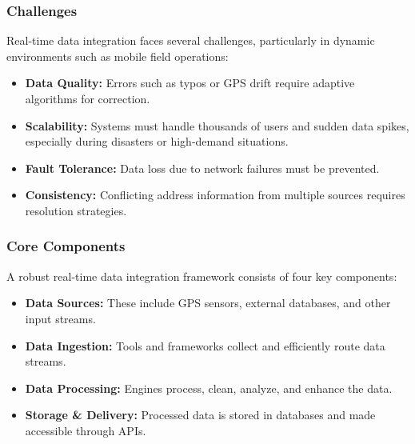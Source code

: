         \subsubsection{Challenges}
        Real-time data integration faces several challenges, particularly in dynamic environments such as mobile field operations: \autocite{vexdata2024Jun}
        
        \begin{itemize}
            \item \textbf{Data Quality:} Errors such as typos or GPS drift require adaptive algorithms for correction.
        
            \item \textbf{Scalability:} Systems must handle thousands of users and sudden data spikes, especially during disasters or high-demand situations.
        
            \item \textbf{Fault Tolerance:} Data loss due to network failures must be prevented.
        
            \item \textbf{Consistency:} Conflicting address information from multiple sources requires resolution strategies.
        \end{itemize}
                
        \subsubsection{Core Components}

        A robust real-time data integration framework consists of four key components: \autocite{Limited2025Mar}

    \begin{itemize}
        \item \textbf{Data Sources:} These include GPS sensors, external databases, and other input streams.  

        \item \textbf{Data Ingestion:} Tools and frameworks collect and efficiently route data streams.  

        \item \textbf{Data Processing:} Engines process, clean, analyze, and enhance the data.  

        \item \textbf{Storage \& Delivery:} Processed data is stored in databases and made accessible through APIs.  

    \end{itemize}


